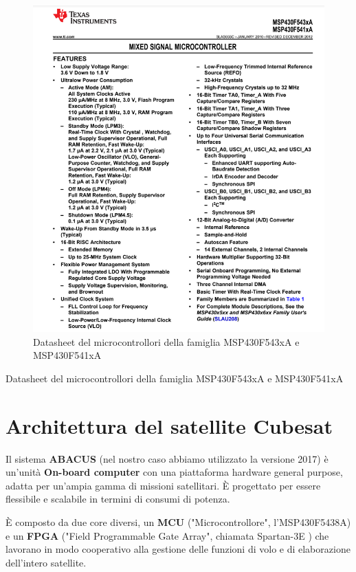 \documentclass[LaM,binding=0.6cm,oneside]{../sapthesis}
\begin{document}
    \begin{figure}[htbp]
    \centerline{\includegraphics[scale=.67]{examples/Msp430Datasheet.PNG}}
    \caption{Datasheet del microcontrollori della famiglia MSP430F543xA e MSP430F541xA}
    \label{fig}
    \end{figure}
Datasheet del microcontrollori della famiglia MSP430F543xA e MSP430F541xA
\clearpage

\section{ Architettura del satellite Cubesat }

Il sistema \textbf{ABACUS} (nel nostro caso abbiamo utilizzato la versione 2017) è un'unità \textbf{On-board computer} con una piattaforma hardware general purpose, adatta per un'ampia
gamma di missioni satellitari. È progettato per essere flessibile e scalabile in termini di consumi di
potenza. 

È composto da due core diversi, un \textbf{MCU} ("Microcontrollore", l'MSP430F5438A) e un \textbf{FPGA} ("Field Programmable Gate Array", chiamata Spartan-3E ) che lavorano in modo cooperativo alla gestione delle funzioni di volo e di elaborazione dell'intero satellite.
\end{document}
